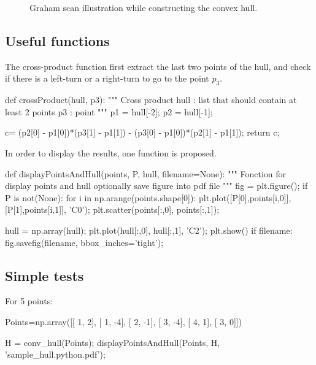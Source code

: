 \begin{figure}[H]
 \centering\caption{Graham scan illustration while constructing the convex hull.}%
 \hfill
 \hfill
 \label{fig:python:convexhull:pause}%
 \vspace*{-10pt}%
\end{figure}

\subsection{Useful functions}

The cross-product function first extract the last two points of the hull, and check if there is a left-turn or a right-turn to go to the point $p_3$.
\begin{python}
def crossProduct(hull, p3):
    """
    Cross product
    hull : list that should contain at least 2 points
    p3   : point
    """
    p1 = hull[-2];
    p2 = hull[-1];
    
    c= (p2[0] - p1[0])*(p3[1] - p1[1]) - (p3[0] - p1[0])*(p2[1] - p1[1]);
    return c;
\end{python}

In order to display the results, one function is proposed.
\begin{python}
def displayPointsAndHull(points, P, hull, filename=None):
    """
    Fonction for display points and hull
    optionally save figure into pdf file
    """
    fig = plt.figure();
    if P is not(None):
        for i in np.arange(points.shape[0]):
            plt.plot([P[0],points[i,0]], [P[1],points[i,1]], 'C0');
    plt.scatter(points[:,0], points[:,1]);
    
    hull = np.array(hull);
    plt.plot(hull[:,0], hull[:,1], 'C2');
    plt.show()
    if filename:
        fig.savefig(filename, bbox_inches='tight');
\end{python}


\subsection{Simple tests}
For 5 points:
\begin{python}
Points=np.array([[ 1,  2],
       [ 1, -4],
       [ 2, -1],
       [ 3, -4],
       [ 4,  1],
       [ 3,  0]])

H = conv_hull(Points);
displayPointsAndHull(Points, H, 'sample_hull.python.pdf');
\end{python}

